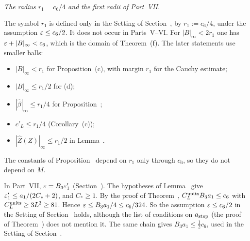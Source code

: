 \begin{detail}\label{det:ledger-r1}
\emph{The radius $r_1=c_6/4$ and the first radii of Part~VII.}

\begin{step}
The symbol $r_1$ is defined only in the Setting of Section~, by $r_1:=c_6/4$, under the assumption $\varepsilon\le c_6/2$. It does not occur in Parts~V--VI. For $|B|_\infty<2r_1$ one has $\varepsilon+|B|_\infty<c_6$, which is the domain of Theorem~(f). The later statements use smaller balls:
\begin{itemize}
\item $|B|_\infty<r_1$ for Proposition~(c), with margin $r_1$ for the Cauchy estimate;
\item $|B|_\infty\le r_1/2$ for (d);
\item $|\hat\beta|_\infty\le r_1/4$ for Proposition~;
\item $c'_L\le r_1/4$ (Corollary~(c));
\item $|\hat Z(Z)|_\infty\le r_1/2$ in Lemma~.
\end{itemize}
The constants of Proposition~ depend on $r_1$ only through $c_6$, so they do not depend on $M$.
\end{step}

\begin{step}
In Part~VII, $\varepsilon=B_3\varepsilon'_1$ (Section~). The hypotheses of Lemma~ give $\varepsilon'_1\le a_1/(2C_*+2)$, and $C_*\ge1$. By the proof of Theorem~, $C^{\rm units}_LB_3a_1\le c_6$ with $C^{\rm units}_L\ge3L^3\ge81$. Hence $\varepsilon\le B_3a_1/4\le c_6/324$. So the assumption $\varepsilon\le c_6/2$ in the Setting of Section~ holds, although the list of conditions on $a_{\rm step}$ (the proof of Theorem~) does not mention it. The same chain gives $B_3a_1\le\frac12c_6$, used in the Setting of Section~.
\end{step}


\end{detail}
